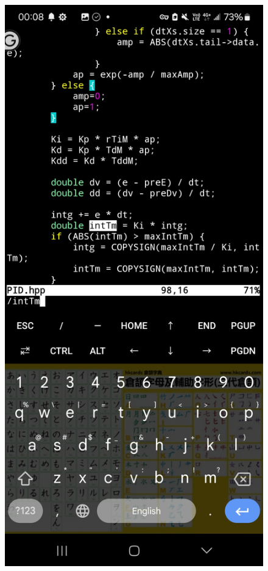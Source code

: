 \documentclass[a4paper,12pt]{./article}
\begin{document}
\begin{center}
\begin{figure}[H]
\begin{minipage}[t]{./0.45\textwidth}
\end{minipage}
\hfill
\begin{minipage}[t]{./0.45\textwidth}
\centering
\includegraphics[width=\textwidth]{./working_screenshots/6.jpg}
\end{minipage}
\hfill
\end{figure}\FloatBarrier\end{center}
\end{document}
